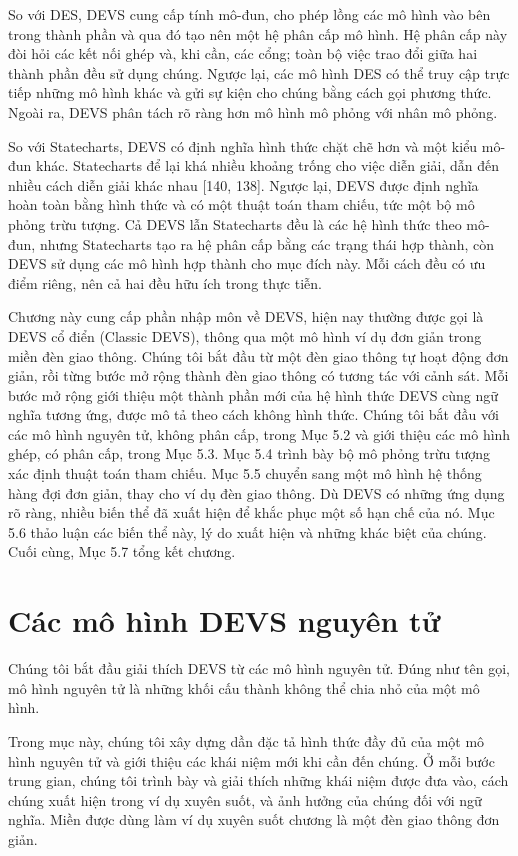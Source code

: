 So với DES, DEVS cung cấp tính mô-đun, cho phép lồng các mô hình vào bên trong thành phần và qua đó tạo nên một hệ phân cấp mô hình. Hệ phân cấp này đòi hỏi các kết nối ghép và, khi cần, các cổng; toàn bộ việc trao đổi giữa hai thành phần đều sử dụng chúng. Ngược lại, các mô hình DES có thể truy cập trực tiếp những mô hình khác và gửi sự kiện cho chúng bằng cách gọi phương thức. Ngoài ra, DEVS phân tách rõ ràng hơn mô hình mô phỏng với nhân mô phỏng.

So với Statecharts, DEVS có định nghĩa hình thức chặt chẽ hơn và một kiểu mô-đun khác. Statecharts để lại khá nhiều khoảng trống cho việc diễn giải, dẫn đến nhiều cách diễn giải khác nhau [140, 138]. Ngược lại, DEVS được định nghĩa hoàn toàn bằng hình thức và có một thuật toán tham chiếu, tức một bộ mô phỏng trừu tượng. Cả DEVS lẫn Statecharts đều là các hệ hình thức theo mô-đun, nhưng Statecharts tạo ra hệ phân cấp bằng các trạng thái hợp thành, còn DEVS sử dụng các mô hình hợp thành cho mục đích này. Mỗi cách đều có ưu điểm riêng, nên cả hai đều hữu ích trong thực tiễn.

Chương này cung cấp phần nhập môn về DEVS, hiện nay thường được gọi là DEVS cổ điển (Classic DEVS), thông qua một mô hình ví dụ đơn giản trong miền đèn giao thông. Chúng tôi bắt đầu từ một đèn giao thông tự hoạt động đơn giản, rồi từng bước mở rộng thành đèn giao thông có tương tác với cảnh sát. Mỗi bước mở rộng giới thiệu một thành phần mới của hệ hình thức DEVS cùng ngữ nghĩa tương ứng, được mô tả theo cách không hình thức. Chúng tôi bắt đầu với các mô hình nguyên tử, không phân cấp, trong Mục 5.2 và giới thiệu các mô hình ghép, có phân cấp, trong Mục 5.3. Mục 5.4 trình bày bộ mô phỏng trừu tượng xác định thuật toán tham chiếu. Mục 5.5 chuyển sang một mô hình hệ thống hàng đợi đơn giản, thay cho ví dụ đèn giao thông. Dù DEVS có những ứng dụng rõ ràng, nhiều biến thể đã xuất hiện để khắc phục một số hạn chế của nó. Mục 5.6 thảo luận các biến thể này, lý do xuất hiện và những khác biệt của chúng. Cuối cùng, Mục 5.7 tổng kết chương.

\section{Các mô hình DEVS nguyên tử}
Chúng tôi bắt đầu giải thích DEVS từ các mô hình nguyên tử. Đúng như tên gọi, mô hình nguyên tử là những khối cấu thành không thể chia nhỏ của một mô hình.

Trong mục này, chúng tôi xây dựng dần đặc tả hình thức đầy đủ của một mô hình nguyên tử và giới thiệu các khái niệm mới khi cần đến chúng. Ở mỗi bước trung gian, chúng tôi trình bày và giải thích những khái niệm được đưa vào, cách chúng xuất hiện trong ví dụ xuyên suốt, và ảnh hưởng của chúng đối với ngữ nghĩa. Miền được dùng làm ví dụ xuyên suốt chương là một đèn giao thông đơn giản.


